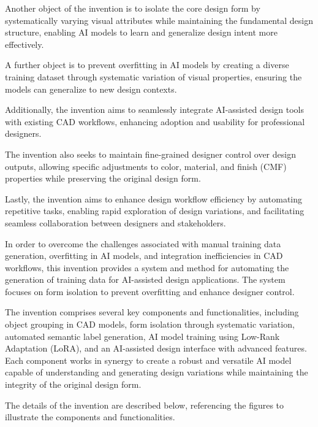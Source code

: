 \patentParagraph
Another object of the invention is to isolate the core design form by systematically varying visual attributes while maintaining the fundamental design structure, enabling AI models to learn and generalize design intent more effectively.

\patentParagraph
A further object is to prevent overfitting in AI models by creating a diverse training dataset through systematic variation of visual properties, ensuring the models can generalize to new design contexts.

\patentParagraph
Additionally, the invention aims to seamlessly integrate AI-assisted design tools with existing CAD workflows, enhancing adoption and usability for professional designers.

\patentParagraph
The invention also seeks to maintain fine-grained designer control over design outputs, allowing specific adjustments to color, material, and finish (CMF) properties while preserving the original design form.

\patentParagraph
Lastly, the invention aims to enhance design workflow efficiency by automating repetitive tasks, enabling rapid exploration of design variations, and facilitating seamless collaboration between designers and stakeholders.


\patentParagraph
In order to overcome the challenges associated with manual training data generation, overfitting in AI models, and integration inefficiencies in CAD workflows, this invention provides a system and method for automating the generation of training data for AI-assisted design applications. The system focuses on form isolation to prevent overfitting and enhance designer control. 

\patentParagraph
The invention comprises several key components and functionalities, including object grouping in CAD models, form isolation through systematic variation, automated semantic label generation, AI model training using Low-Rank Adaptation (LoRA), and an AI-assisted design interface with advanced features. Each component works in synergy to create a robust and versatile AI model capable of understanding and generating design variations while maintaining the integrity of the original design form.

\patentDrawingDescriptions{\noindent }


\patentParagraph
The details of the invention are described below, referencing the figures to illustrate the components and functionalities.

